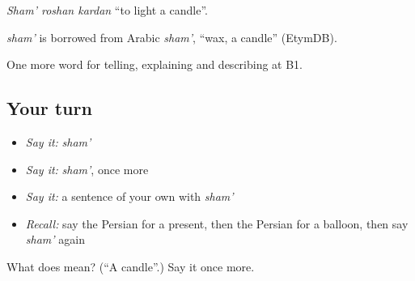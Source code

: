 \emph{Sham' roshan kardan} \textquotedblleft{}to light a candle\textquotedblright{}.

\begin{cousinweb}
\emph{sham'} is borrowed from Arabic \emph{sham'}, \textquotedblleft{}wax, a candle\textquotedblright{} (EtymDB).
\end{cousinweb}

\begin{grammarlens}[title={What you've built}]
One more word for telling, explaining and describing at B1.
\end{grammarlens}

\subsection*{Your turn}
\begin{itemize}
\raggedright
  \item \emph{Say it:} \emph{sham'}
  \item \emph{Say it:} \emph{sham'}, once more
  \item \emph{Say it:} a sentence of your own with \emph{sham'}
  \item \emph{Recall:} say the Persian for a present, then the Persian for a balloon, then say \emph{sham'} again
\end{itemize}

\begin{tcolorbox}[breakable,colback=teal!4,colframe=teal!35!black,title={Before you move on}]
What does  mean? (\textquotedblleft{}A candle\textquotedblright{}.) Say it once more.
\end{tcolorbox}
